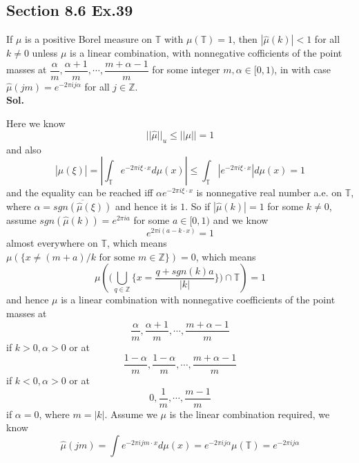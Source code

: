 \documentclass[lang=en,11pt,a4paper,citestyle =authoryear]{elegantpaper}
\newcommand{\Z}{\mathbb{Z}}
\begin{document}
\subsection*{Section 8.6 Ex.39}
If $\mu$ is a positive Borel measure on $\mathbb{T}$ with $\mu(\mathbb{T})=1$, then $|\widehat{\mu}(k)| < 1$ for all $k\neq 0$ unless $\mu$ is a linear combination, with nonnegative cofficients of the point masses at $\dfrac{\alpha}{m},\dfrac{\alpha+1}{m},\cdots,\dfrac{m+\alpha-1}{m}$ for some integer $m, \alpha \in [0,1)$, in with case $\widehat{\mu}(jm) = e^{-2\pi ij\alpha}$ for all $j\in\Z$.
\vspace{0.5em}\\
\textbf{Sol.} \par
    Here we know
    \[
    ||\widehat{\mu}||_u \leq ||\mu|| = 1
    \]
    and also
    \[
    |\widehat{\mu}(\xi)| = |\int_{\mathbb{T}} e^{-2\pi i \xi \cdot x} d\mu(x)| \leq \int_{\mathbb{T}}|e^{-2\pi i \xi \cdot x}|d\mu(x) = 1 
    \]
    and the equality can be reached iff $\alpha e^{-2\pi i \xi\cdot x}$ is nonnegative real number a.e. on $\mathbb{T}$, where $\alpha = \overline{sgn(\hat{\mu}(\xi))}$ and hence it is $1$. So if $|\widehat{\mu}(k)| = 1$ for some $k\neq 0$, assume $sgn(\hat{\mu}(k)) = e^{2\pi i a}$ for some $a\in[0,1)$ and we know
    \[
    e^{2\pi i(a - k \cdot x)} = 1
    \]
    almost everywhere on $\mathbb{T}$, which means $\mu(\{x \neq (m+a)/k\text{ for some }m\in\Z\}) = 0$, which means
    \[\mu(\Big(\bigcup_{q\in\Z}\{x = \dfrac{q+sgn(k)a}{|k|}\}\Big)\cap\mathbb{T}) = 1\]
    and hence $\mu$ is a linear combination with nonnegative coefficients of the point masses at \[\dfrac{\alpha}{m},\dfrac{\alpha+1}{m},\cdots,\dfrac{m+\alpha-1}{m}\] if $k>0,\alpha > 0$ or at \[\dfrac{1-\alpha}{m},\dfrac{1-\alpha}{m},\cdots,\dfrac{m+\alpha-1}{m}\] if $k<0,\alpha > 0$ or at \[0,\dfrac{1}{m},\cdots,\dfrac{m-1}{m}\] if $\alpha = 0$, where $m = |k|$. Assume we $\mu$ is the linear combination required, we know
    \[
    \widehat{\mu}(jm) = \int e^{-2\pi i jm\cdot x}d\mu(x) = e^{-2\pi i j \alpha}\mu(\mathbb{T}) = e^{-2\pi i j \alpha}
    \]
\addappheadtotoc
\end{document}
